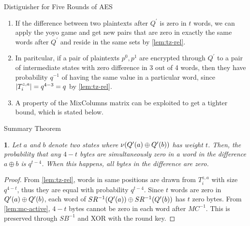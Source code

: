 \documentclass[notheorems]{beamer}
\newtheorem{theorem}{\translate{Theorem}}[section]
\newtheorem{theorem}{\translate{Theorem}}
\newtheorem{lemma}{\translate{Lemma}}
\theoremstyle{definition}
\theoremstyle{example}
\begin{document}
    \begin{frame}{Distiguisher for Five Rounds of AES}
        \begin{enumerate}
            \item<1-> If the difference between two plaintexts after
            \(Q^\prime\) is zero in \(t\) words, we can apply the yoyo game and
            get new pairs that are zero in exactly the same words after
            \(Q^\prime\) and reside in the same sets by \cref{lem:tz-rel}.
            \item<2-> In paritcular, if a pair of plaintexts \(p^0, p^1\) are
            encrypted through \(Q^\prime\) to a pair of intermediate states with
            zero difference in 3 out of 4 words, then they have probability
            \(q^{-1}\) of having the same value in a particular word, since
            \(\left\vert T_i^{z, a}\right\vert = q^{4 - 3} = q\) by \cref{lem:tz-rel}.
            \item<3-> A property of the MixColumns matrix can be exploited to
            get a tighter bound, which is stated below.
        \end{enumerate}
    \end{frame}

    \begin{frame}{Summary Theorem}
        \begin{theorem}
            \label{thm:q-weight}
            Let \(a\) and \(b\) denote two states where
            \(\nu(Q^\prime(a) \oplus Q^\prime(b))\) has weight
            \(t\). Then, the probability that any \(4 - t\) bytes are
            simultaneously zero in a word in the difference \(a \oplus b\) is
            \(q^{t - 4}\). When this happens, all bytes in the difference are
            zero.
        \end{theorem}
        \pause        
        \begin{proof}
            From \cref{lem:tz-rel}, words in same positions are drawn from
            \(T_i^{z, a}\) with size \(q^{4 - t}\), thus they are equal with
            probability \(q^{t - 4}\). Since \(t\) words are zero in
            \(Q^\prime(a) \oplus Q^\prime(b)\), each word of
            \(SR^{-1}(Q^\prime(a)) \oplus
            SR^{-1}(Q^\prime(b))\) has \(t\) zero bytes. From
            \cref{lem:mc-active}, \(4 - t\) bytes cannot be zero in each word
            after \(MC^{-1}\). This is preserved through \(SB^{-1}\) and XOR
            with the round key.
        \end{proof}
    \end{frame}
\end{document}
